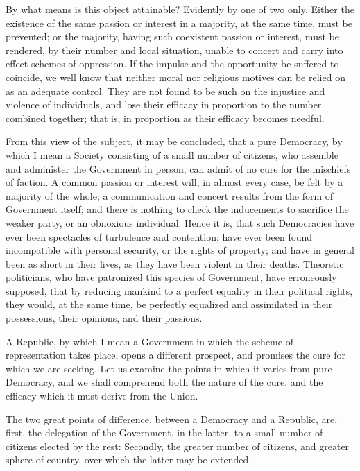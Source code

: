 By what means is this object attainable? Evidently by one of two only.
Either the existence of the same passion or interest in a majority, at
the same time, must be prevented; or the majority, having such
coexistent passion or interest, must be rendered, by their number and
local situation, unable to concert and carry into effect schemes of
oppression. If the impulse and the opportunity be suffered to
coincide, we well know that neither moral nor religious motives can be
relied on as an adequate control. They are not found to be such on the
injustice and violence of individuals, and lose their efficacy in
proportion to the number combined together; that is, in proportion as
their efficacy becomes needful.

From this view of the subject, it may be concluded, that a pure
Democracy, by which I mean a Society consisting of a small number of
citizens, who assemble and administer the Government in person, can
admit of no cure for the mischiefs of faction. A common passion or
interest will, in almost every case, be felt by a majority of the
whole; a communication and concert results from the form of Government
itself; and there is nothing to check the inducements to sacrifice the
weaker party, or an obnoxious individual. Hence it is, that such
Democracies have ever been spectacles of turbulence and contention;
have ever been found incompatible with personal security, or the
rights of property; and have in general been as short in their lives,
as they have been violent in their deaths. Theoretic politicians, who
have patronized this species of Government, have erroneously supposed,
that by reducing mankind to a perfect equality in their political
rights, they would, at the  same time, be perfectly equalized
and assimilated in their possessions, their opinions, and their
passions.

A Republic, by which I mean a Government in which the scheme of
representation takes place, opens a different prospect, and promises
the cure for which we are seeking. Let us examine the points in which
it varies from pure Democracy, and we shall comprehend both the nature
of the cure, and the efficacy which it must derive from the Union.

The two great points of difference, between a Democracy and a
Republic, are, first, the delegation of the Government, in the latter,
to a small number of citizens elected by the rest: Secondly, the
greater number of citizens, and greater sphere of country, over which
the latter may be extended.

